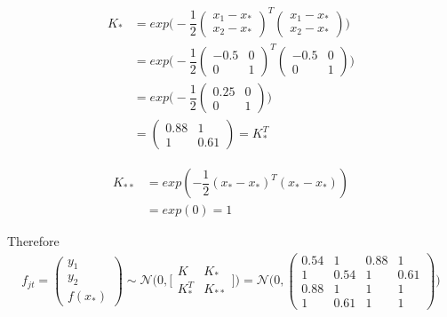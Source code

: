 \documentclass[11pt]{article}
\begin{document}
\begin{align*}
	K_* &= exp\big(-\dfrac{1}{2}
	\begin{pmatrix}
		x_1 - x_* \\
		x_2 - x_*
	\end{pmatrix}^T 
	\begin{pmatrix}
		x_1 - x_* \\
		x_2 - x_*
	\end{pmatrix}
	\big)\\	
	&= exp\big(-\dfrac{1}{2}
	\begin{pmatrix}
		-0.5 & 0\\
		0 & 1
	\end{pmatrix}^T 
	\begin{pmatrix}
		-0.5 & 0\\
		0 & 1
	\end{pmatrix}
	\big)\\	
	&= exp\big(-\dfrac{1}{2}
	\begin{pmatrix}
		0.25 & 0 \\
		0 & 1
	\end{pmatrix}
	\big)\\	
	&=
	\begin{pmatrix}
		0.88 & 1 \\
		1 & 0.61
	\end{pmatrix} = K^T_*
\end{align*}

\begin{align*}
	K_{**} &= exp(-\dfrac{1}{2} (x_* - x_*)^T (x_* - x_*)) \\
		   &= exp(0) = 1
\end{align*}

Therefore
\begin{align*}
	f_{jt} =
	\begin{pmatrix}
		y_1\\
		y_2\\
		f(x_*)
	\end{pmatrix}
	\sim \mathcal N \Big(0, \Big[
	\begin{matrix}
	K & K_* \\
	K^T_* & K_{**}
	\end{matrix}
	\Big]\Big)
	= \mathcal N \Big(0,
	\begin{pmatrix}
		0.54 & 1 & 0.88 & 1\\
		1 & 0.54 & 1 & 0.61\\		
		0.88 & 1 & 1 & 1\\
		1 & 0.61 & 1 & 1
	\end{pmatrix}
	\Big)
\end{align*}
\end{document}

